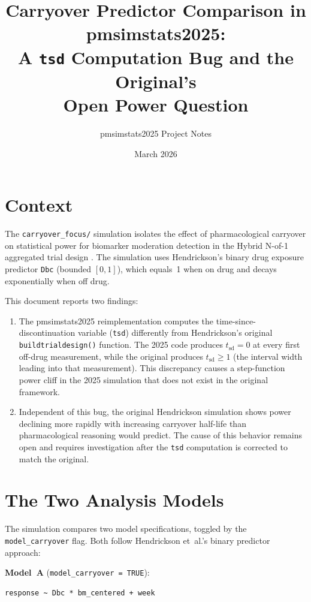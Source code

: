 \documentclass[11pt]{article}
\title{Carryover Predictor Comparison in pmsimstats2025:\\
  A \texttt{tsd} Computation Bug and the Original's\\
  Open Power Question}
\author{pmsimstats2025 Project Notes}
\date{March 2026}
\begin{document}
\maketitle

\section{Context}

The \texttt{carryover\_focus/} simulation isolates the effect of
pharmacological carryover on statistical power for biomarker moderation
detection in the Hybrid N-of-1 aggregated trial design
\cite{hendrickson2020}. The simulation uses Hendrickson's binary drug
exposure predictor \texttt{Dbc} (bounded $[0, 1]$), which equals~1
when on drug and decays exponentially when off drug.

This document reports two findings:

\begin{enumerate}
  \item The pmsimstats2025 reimplementation computes the
    time-since-discontinuation variable (\texttt{tsd}) differently
    from Hendrickson's original \texttt{buildtrialdesign()} function.
    The 2025 code produces $t_{\text{sd}} = 0$ at every first off-drug
    measurement, while the original produces $t_{\text{sd}} \geq 1$
    (the interval width leading into that measurement). This
    discrepancy causes a step-function power cliff in the 2025
    simulation that does not exist in the original framework.

  \item Independent of this bug, the original Hendrickson simulation
    shows power declining more rapidly with increasing carryover
    half-life than pharmacological reasoning would predict. The cause
    of this behavior remains open and requires investigation after the
    \texttt{tsd} computation is corrected to match the original.
\end{enumerate}

\section{The Two Analysis Models}

The simulation compares two model specifications, toggled by the
\texttt{model\_carryover} flag. Both follow Hendrickson et~al.'s
\cite{hendrickson2020} binary predictor approach:

\medskip
\noindent\textbf{Model~A} (\texttt{model\_carryover = TRUE}):
\begin{verbatim}
response ~ Dbc * bm_centered + week
\end{verbatim}
\end{document}
